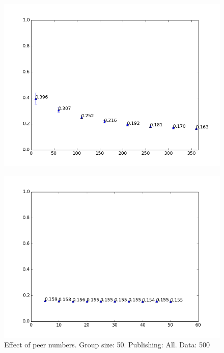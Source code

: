 \begin{figure}[h!]
\begin{minipage}{.49\linewidth}
		\label{fig:data_limit_test_withlocalmodel}
	\end{minipage}
	\begin{minipage}{.49\linewidth}
		\includegraphics[width=\linewidth]{fig/spambase/eps0.1,budg=eps,peers10,groups10,reg2e-2-pubAll-spam-baseline-data10-360-testset-localmodelonly}
		\label{fig:data_limit_test_localmodelonly}
	\end{minipage}
\end{figure}

\begin{figure}[h]
	\centering
	\includegraphics[width=\textwidth]{fig/adult/eps1.0,budg=eps,peers5-55,groups5,reg2e2-data500-pubAll-adult-groupbypeerverification-3-testsetmean}
	\caption{Effect of peer numbers. Group size: 50. Publishing: All. Data: 500}
	\label{fig:peer_range_constant_group}
\end{figure}


